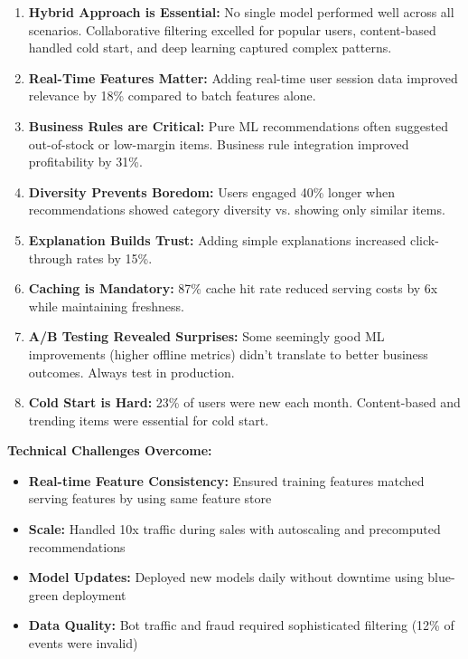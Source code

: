 \begin{enumerate}
    \item \textbf{Hybrid Approach is Essential:} No single model performed well across all scenarios. Collaborative filtering excelled for popular users, content-based handled cold start, and deep learning captured complex patterns.

    \item \textbf{Real-Time Features Matter:} Adding real-time user session data improved relevance by 18\% compared to batch features alone.

    \item \textbf{Business Rules are Critical:} Pure ML recommendations often suggested out-of-stock or low-margin items. Business rule integration improved profitability by 31\%.

    \item \textbf{Diversity Prevents Boredom:} Users engaged 40\% longer when recommendations showed category diversity vs. showing only similar items.

    \item \textbf{Explanation Builds Trust:} Adding simple explanations increased click-through rates by 15\%.

    \item \textbf{Caching is Mandatory:} 87\% cache hit rate reduced serving costs by 6x while maintaining freshness.

    \item \textbf{A/B Testing Revealed Surprises:} Some seemingly good ML improvements (higher offline metrics) didn't translate to better business outcomes. Always test in production.

    \item \textbf{Cold Start is Hard:} 23\% of users were new each month. Content-based and trending items were essential for cold start.
\end{enumerate}

\textbf{Technical Challenges Overcome:}

\begin{itemize}
    \item \textbf{Real-time Feature Consistency:} Ensured training features matched serving features by using same feature store
    \item \textbf{Scale:} Handled 10x traffic during sales with autoscaling and precomputed recommendations
    \item \textbf{Model Updates:} Deployed new models daily without downtime using blue-green deployment
    \item \textbf{Data Quality:} Bot traffic and fraud required sophisticated filtering (12\% of events were invalid)
\end{itemize}

